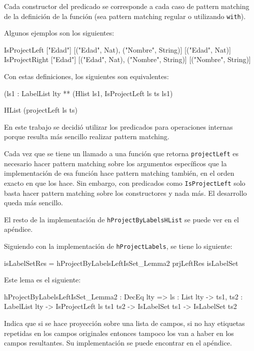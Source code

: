 Cada constructor del predicado se corresponde a cada caso de pattern matching de la definición de la función (sea pattern matching regular o utilizando \texttt{with}).

Algunos ejemplos son los siguientes:

\begin{code}
IsProjectLeft ["Edad"] [("Edad", Nat), ("Nombre", String)]
  [("Edad", Nat)]
IsProjectRight ["Edad"] [("Edad", Nat), ("Nombre", String)]
  [("Nombre", String)]
\end{code}

Con estas definiciones, los siguientes son equivalentes:

\begin{code}
(ls1 : LabelList lty ** (Hlist ls1, IsProjectLeft ls ts ls1)

HList (projectLeft ls ts)
\end{code}

En este trabajo se decidió utilizar los predicados para operaciones internas porque resulta más sencillo realizar pattern matching.

Cada vez que se tiene un llamado a una función que retorna \texttt{projectLeft} es necesario hacer pattern matching sobre los argumentos específicos que la implementación de esa función hace pattern matching también, en el orden exacto en que los hace. Sin embargo, con predicados como \texttt{IsProjectLeft} solo basta hacer pattern matching sobre los constructores y nada más. El desarrollo queda más sencillo.

El resto de la implementación de \texttt{hProjectByLabelsHList} se puede ver en el apéndice.

Siguiendo con la implementación de \texttt{hProjectLabels}, se tiene lo siguiente:

\begin{code}
isLabelSetRes =
  hProjectByLabelsLeftIsSet_Lemma2 prjLeftRes isLabelSet
\end{code}

Este lema es el siguiente:

\begin{code}
hProjectByLabelsLeftIsSet_Lemma2 : DecEq lty => {ls : List lty} ->
  {ts1, ts2 : LabelList lty} -> IsProjectLeft ls ts1 ts2 ->
  IsLabelSet ts1 -> IsLabelSet ts2
\end{code}

Indica que si se hace proyección sobre una lista de campos, si no hay etiquetas repetidas en los campos originales entonces tampoco los van a haber en los campos resultantes. Su implementación se puede encontrar en el apéndice.

